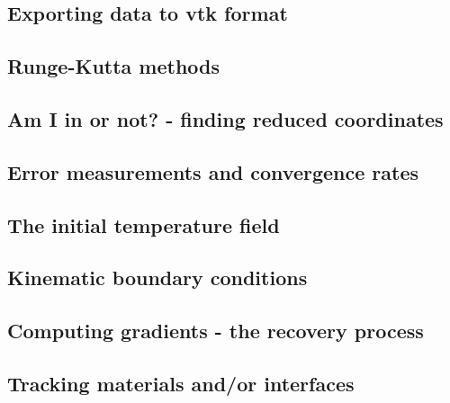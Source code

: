 \documentclass[a4paper]{article}
\begin{document}
\subsection{Exporting data to vtk format}  %
\newpage %
\subsection{Runge-Kutta methods}  %
\newpage %
\subsection{Am I in or not? - finding reduced coordinates}\label{sec:amiin} %
\newpage %
\subsection{Error measurements and convergence rates}  %
\newpage %
\subsection{The initial temperature field}  %
\newpage %
\subsection{Kinematic boundary conditions}  %
\newpage %
\subsection{Computing gradients - the recovery process}  %
\newpage %
\subsection{Tracking materials and/or interfaces}  %
\newpage %
\end{document}
